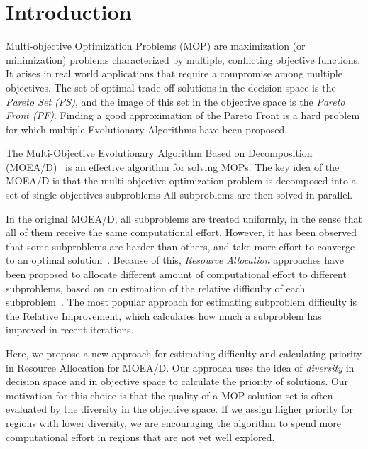 \section{Introduction}

Multi-objective Optimization Problems (MOP) are maximization (or minimization)
problems characterized by multiple, conflicting objective functions. It arises
in real world applications that require a compromise among multiple objectives.
The set of optimal trade off solutions in the decision space is the \emph{Pareto
Set (PS)}, and the image of this set in the objective space is the \emph{Pareto
Front (PF)}. Finding a good approximation of the Pareto Front is a hard problem for
which multiple Evolutionary Algorithms have been proposed.

The Multi-Objective Evolutionary Algorithm Based on Decomposition
(MOEA/D)~\cite{zhang2007moea} is an effective algorithm for solving MOPs. The
key idea of the MOEA/D is that the multi-objective optimization problem is
decomposed into a set of single objectives subproblems All subproblems
are then solved in parallel.

In the original MOEA/D, all subproblems are treated uniformly, in the sense that
all of them receive the same computational effort. However, it has been observed
that some subproblems are harder than others, and take more effort to converge
to an optimal solution~\cite{zhou2016all}. Because of this, \emph{Resource
Allocation} approaches have been proposed to allocate different amount of
computational effort to different subproblems, based on an estimation of the
relative difficulty of each subproblem~\cite{zhou2016all, zhang2009performance,
kang2018collaborative}. The most popular approach for estimating subproblem
difficulty is the Relative Improvement, which calculates how much a subproblem
has improved in recent iterations.

Here, we propose a new approach for estimating difficulty and
calculating priority in Resource Allocation for MOEA/D. Our approach uses the
idea of \emph{diversity} in decision space and in objective space to calculate
the priority of solutions. Our motivation for this choice is that the quality of
a MOP solution set is often evaluated by the diversity in the objective space.
If we assign higher priority for regions with lower diversity, we are
encouraging the algorithm to spend more computational effort in regions that are
not yet well explored.

